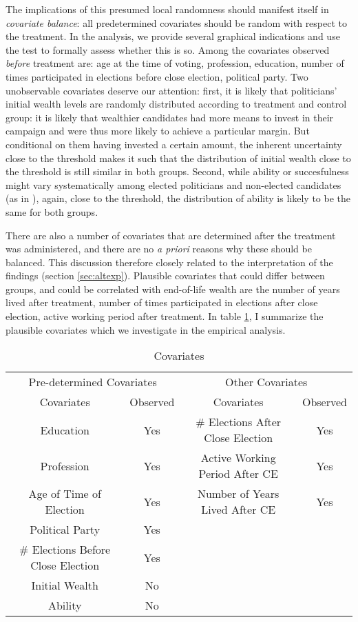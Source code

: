 \documentclass[12pt]{article}
\begin{document}
The implications of this presumed local randomness should manifest itself in \textit{covariate balance}: all predetermined covariates should be random with respect to the treatment. In the analysis, we provide several graphical indications and use the \cite{mccrary2008manipulation} test to formally assess whether this is so. Among the covariates observed \textit{before} treatment are: age at the time of voting, profession, education, number of times participated in elections before close election, political party. Two unobservable covariates deserve our attention: first, it is likely that politicians' initial wealth levels are randomly distributed according to treatment and control group: it is likely that wealthier candidates had more means to invest in their campaign and were thus more likely to achieve a particular margin. But conditional on them having invested a certain amount, the inherent uncertainty close to the threshold makes it such that the distribution of initial wealth close to the threshold is still similar in both groups. Second, while ability or succesfulness might vary systematically among elected politicians and non-elected candidates (as in \cite{thompson2019becomes}), again, close to the threshold, the distribution of ability is likely to be the same for both groups. 

There are also a number of covariates that are determined after the treatment was administered, and there are no \textit{a priori} reasons why these should be balanced. This discussion therefore closely related to the interpretation of the findings (section \ref{sec:altexp}). Plausible covariates that could differ between groups, and could be correlated with end-of-life wealth are the number of years lived after treatment, number of times participated in elections after close election, active working period after treatment. In table \ref{tab:tabcovariates}, I summarize the plausible covariates which we investigate in the empirical analysis. 


\begin{table}[!ht]
\footnotesize
    \centering
    \begin{tabular}{cccc}
        \multicolumn{2}{c}{Pre-determined Covariates} & \multicolumn{2}{c}{Other Covariates}\\
        Covariates & Observed & Covariates & Observed \\ \hline
        Education & Yes & \# Elections After Close Election & Yes\\
        Profession & Yes & Active Working Period After CE & Yes\\
        Age of Time of Election & Yes & Number of Years Lived After CE & Yes\\
        Political Party & Yes & & \\
        \# Elections Before Close Election & Yes & &  \\
        Initial Wealth & No & & \\
        Ability & No & & 
    \end{tabular}
    \caption{Covariates}
    \label{tab:tabcovariates}
\end{table}
\end{document}
